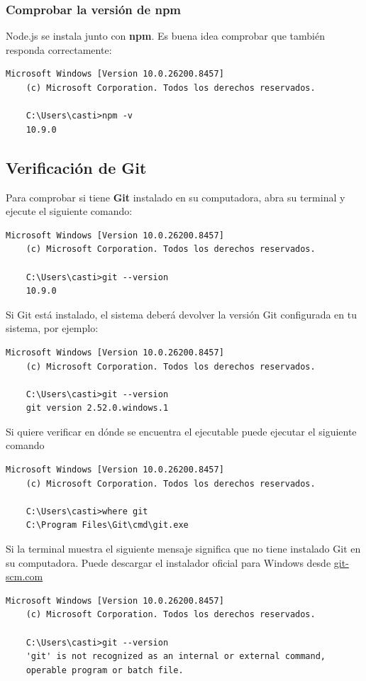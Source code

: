 \documentclass[
10pt, %
a4paper, %
oneside, %
headinclude,footinclude, %
BCOR5mm, %
]{scrartcl}
\begin{document}
\subsubsection{Comprobar la versión de npm}
Node.js se instala junto con \textbf{npm}. Es buena idea comprobar que también responda correctamente:
\begin{lstlisting}[language=DOS]
	Microsoft Windows [Version 10.0.26200.8457]
	(c) Microsoft Corporation. Todos los derechos reservados.
	
	C:\Users\casti>npm -v
	10.9.0
\end{lstlisting}

\subsection{Verificación de Git}
Para comprobar si tiene \textbf{Git} instalado en su computadora, abra su terminal y ejecute el siguiente comando:
\begin{lstlisting}[language=DOS]
	Microsoft Windows [Version 10.0.26200.8457]
	(c) Microsoft Corporation. Todos los derechos reservados.
	
	C:\Users\casti>git --version
	10.9.0
\end{lstlisting}

Si Git está instalado, el sistema deberá devolver la versión Git configurada en tu sistema, por ejemplo:
\begin{lstlisting}[language=DOS]
	Microsoft Windows [Version 10.0.26200.8457]
	(c) Microsoft Corporation. Todos los derechos reservados.
	
	C:\Users\casti>git --version
	git version 2.52.0.windows.1
\end{lstlisting}

Si quiere verificar en dónde se encuentra el ejecutable puede ejecutar el siguiente comando
\begin{lstlisting}[language=DOS]
	Microsoft Windows [Version 10.0.26200.8457]
	(c) Microsoft Corporation. Todos los derechos reservados.
	
	C:\Users\casti>where git
	C:\Program Files\Git\cmd\git.exe
\end{lstlisting}

Si la terminal muestra el siguiente mensaje significa que no tiene instalado Git en su computadora. Puede descargar el instalador oficial para Windows desde \href{https://git-scm.com/}{git-scm.com}
\begin{lstlisting}[language=DOS]
	Microsoft Windows [Version 10.0.26200.8457]
	(c) Microsoft Corporation. Todos los derechos reservados.
	
	C:\Users\casti>git --version
	'git' is not recognized as an internal or external command,
	operable program or batch file.
\end{lstlisting}
\end{document}

